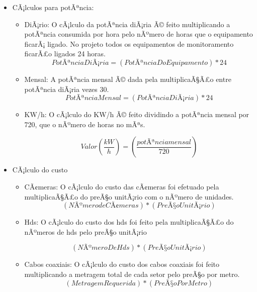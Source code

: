 \begin{itemize}
	\item CÃ¡lculos para potÃªncia:
	\begin{itemize}
		\item DiÃ¡rio:
		O cÃ¡lculo da potÃªncia diÃ¡ria Ã© feito multiplicando a potÃªncia consumida por hora pelo nÃºmero de horas que o equipamento ficarÃ¡ ligado. No projeto todos os equipamentos de monitoramento ficarÃ£o ligados 24 horas.
		\begin{equation}
			PotÃªncia DiÃ¡ria = (PotÃªncia Do Equipamento) \ast  24
		\end{equation}

		\item Mensal:
		A potÃªncia mensal Ã© dada pela multiplicaÃ§Ã£o entre potÃªncia diÃ¡ria vezes 30.
		\begin{equation}
			PotÃªncia Mensal =  (PotÃªncia DiÃ¡ria) \ast  24
		\end{equation}
		
		
		\item KW/h:
		O cÃ¡lculo do KW/h Ã© feito dividindo a potÃªncia mensal por 720, que o nÃºmero de horas no mÃªs.
		
		\begin{equation}
			Valor(\frac{kW}{h}) = (\frac{potÃªncia mensal}{720})
		\end{equation}
			
	\end{itemize}
	
	\item CÃ¡lculo do custo
	\begin{itemize}
		\item CÃ¢meras:
   		 O cÃ¡lculo do custo das cÃ¢meras foi efetuado pela multiplicaÃ§Ã£o do preÃ§o unitÃ¡rio com o nÃºmero de unidades.
		\begin{equation}
		(NÃºmero de CÃ¢meras) \ast  (PreÃ§o UnitÃ¡rio)
		\end{equation}
		
		\item Hds:
  		O cÃ¡lculo do custo dos hds foi feito pela multiplicaÃ§Ã£o do nÃºmeros de  hds pelo preÃ§o unitÃ¡rio

		\begin{equation}
		(NÃºmero De Hds) \ast  (PreÃ§o UnitÃ¡rio)
		\end{equation}		 

		\item Cabos coaxiais:
		O cÃ¡lculo do custo dos cabos coaxiais foi feito multiplicando a metragem total de cada setor pelo preÃ§o por metro.
		\begin{equation}
		(Metragem Requerida) \ast (PreÃ§o Por Metro)	
		\end{equation}			
	\end{itemize}
\end{itemize}

